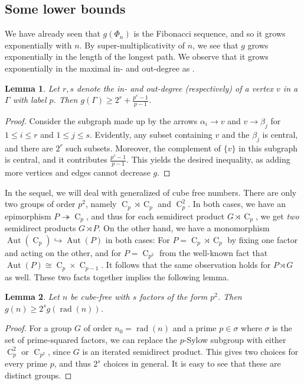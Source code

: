 \documentclass[draft]{article}
\newcommand{\aut}[1]{\operatorname{Aut}(#1)}
\newcommand{\cyc}[1]{\operatorname{C}_{#1}}
\theoremstyle{plain}
\newtheorem{lem}{Lemma}[section]
\theoremstyle{definition}
\begin{document}
\subsection{Some lower bounds}
We have already seen that $g(\Phi_n)$ is the Fibonacci sequence, and so it grows exponentially with $n$. By super-multiplicativity of $n$, we see that $g$ grows exponentially in the length of the longest path. We observe that it grows exponentially in the maximal in- and out-degree as .
\begin{lem}
	Let $r, s$ denote the in- and out-degree (respectively) of a vertex $v$ in a \hg[1] $\Gamma$ with label $p$. Then $g(\Gamma) \ge 2^r + \frac{p^s - 1}{p - 1}$.
\end{lem}
\begin{proof}
	Consider the subgraph made up by the arrows $\alpha_i \rightarrow v$ and $v \rightarrow \beta_j$ for $1 \le i \le r$ and $1 \le j \le s$. Evidently, any subset containing $v$ and the $\beta_j$ is central, and there are $2^r$ such subsets. Moreover, the complement of $\{v\}$ in this subgraph is central, and it contributes $\frac{p^s - 1}{p - 1}$. This yields the desired inequality, as adding more vertices and edges cannot decrease \nolinebreak[4] $g$.
\end{proof}
In the sequel, we will deal with generalized \hgs[1] of cube free numbers. There are only two groups of order $p^2$, namely $\cyc{p} \rtimes \cyc{p}$ and $\cyc{p}^2$. In both cases, we have an epimorphism $P \twoheadrightarrow \cyc{p}$, and thus for each semidirect product $G \rtimes \cyc{p}$, we get \textit{two} semidirect products $G \rtimes P$. On the other hand, we have a monomorphism $\aut{\cyc{p}} \hookrightarrow \aut{P}$ in both cases: For $P = \cyc{p} \rtimes \cyc{p}$ by fixing one factor and acting on the other, and for $P = \cyc{p^2}$ from the well-known fact that $\aut{P} \cong \cyc{p} \times \cyc{p - 1}$. It follows that the same observation holds for $P \rtimes G$ as well. These two facts together implies the following lemma.
\begin{lem}
	Let $n$ be cube-free with $s$ factors of the form $p^2$. Then $g(n) \ge 2^s g(\operatorname{rad}(n))$.
\end{lem}
\begin{proof}
	For a group $G$ of order $n_0 = \operatorname{rad}(n)$ and a prime $p \in \sigma$ where $\sigma$ is the set of prime-squared factors, we can replace the $p$-Sylow subgroup with either $\cyc{p}^2$ or $\cyc{p^2}$, since $G$ is an iterated semidirect product. This gives two choices for every prime $p$, and thus $2^s$ choices in general. It is easy to see that these are distinct groups.
\end{proof}
\end{document}
